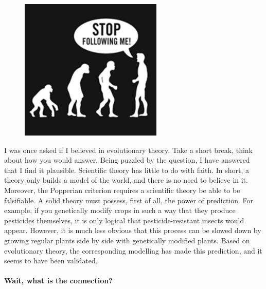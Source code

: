 \documentclass[notitlepage,oneside]{book}
\begin{document}
\begin{figure}
\includegraphics[width=\linewidth]{img/stop-following-me.png}
\end{figure}
I was once asked if I believed in evolutionary theory. 
Take a short break, think about how you would answer.
Being puzzled by the question, I have answered that I find it plausible. 
Scientific theory has little to do with faith.
In short, a theory only builds a model of the world, and there is no need to believe in it.
Moreover, the Popperian criterion\cite{popper1935logik} requires a scientific theory be able to be falsifiable. 
A solid theory must possess, first of all, the power of prediction.
For example, if you genetically modify crops in such a way that they produce pesticides themselves, 
it is only logical that pesticide-resistant insects would appear. 
However, it is much less obvious that this process can be slowed down by growing regular plants side by side with genetically modified plants. 
Based on evolutionary theory, the corresponding modelling has made this prediction\cite{CERDA2004163}, and it seems to have been validated\cite{Tabashnik}.

\paragraph*{Wait, what is the connection?}
\end{document}
